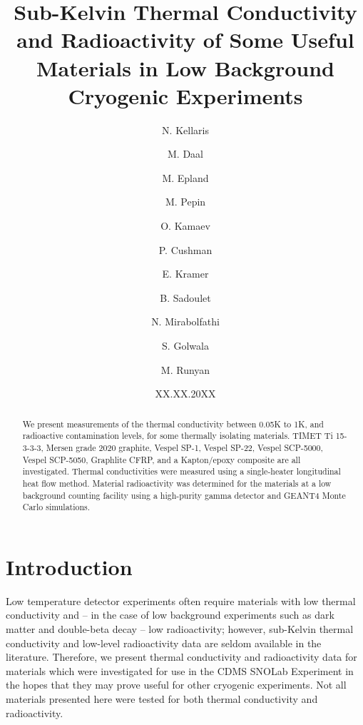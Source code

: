 \documentclass[final]{svjour2}
\begin{document}
\newcommand{\hdblarrow}{H\makebox[0.9ex][l]{$\downdownarrows$}-}
\title{Sub-Kelvin Thermal Conductivity and Radioactivity of Some Useful Materials in Low Background Cryogenic Experiments}

\author{N. Kellaris \and M. Daal \and M. Epland \and M. Pepin \and O. Kamaev \and P. Cushman \and E. Kramer \and B. Sadoulet \and N. Mirabolfathi \and S. Golwala \and M. Runyan}


\date{XX.XX.20XX}

\maketitle


\begin{abstract}
     We present measurements of the thermal conductivity between 0.05K to 1K, and radioactive contamination levels, for some thermally isolating materials. TIMET Ti 15-3-3-3, Mersen grade 2020 graphite, Vespel SP-1, Vespel SP-22, Vespel SCP-5000, Vespel SCP-5050, Graphlite CFRP, and a Kapton/epoxy composite are all investigated. Thermal conductivities were measured using a single-heater longitudinal heat flow method. Material radioactivity was determined for the materials at a low background counting facility using a high-purity gamma detector and GEANT4 Monte Carlo simulations.



\end{abstract}

\section{Introduction}
Low temperature detector experiments often require materials with low thermal conductivity and -- in the case of low background experiments such as dark matter and double-beta decay -- low radioactivity; however, sub-Kelvin thermal conductivity and low-level radioactivity data are seldom available in the literature. Therefore, we present thermal conductivity and radioactivity data for materials which were investigated for use in the CDMS SNOLab Experiment in the hopes that they may prove useful for other cryogenic experiments. Not all materials presented here were tested for both thermal conductivity and radioactivity.
\end{document}
